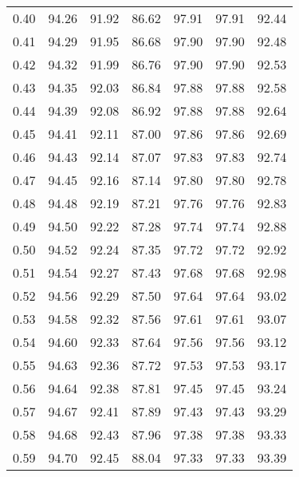 \begin{tabular}{|c|c|c|c|c|c|c|}
      0.40 &     94.26 &     91.92 &      86.62 &   97.91 &      97.91 &         92.44 \\
      0.41 &     94.29 &     91.95 &      86.68 &   97.90 &      97.90 &         92.48 \\
      0.42 &     94.32 &     91.99 &      86.76 &   97.90 &      97.90 &         92.53 \\
      0.43 &     94.35 &     92.03 &      86.84 &   97.88 &      97.88 &         92.58 \\
      0.44 &     94.39 &     92.08 &      86.92 &   97.88 &      97.88 &         92.64 \\
      0.45 &     94.41 &     92.11 &      87.00 &   97.86 &      97.86 &         92.69 \\
      0.46 &     94.43 &     92.14 &      87.07 &   97.83 &      97.83 &         92.74 \\
      0.47 &     94.45 &     92.16 &      87.14 &   97.80 &      97.80 &         92.78 \\
      0.48 &     94.48 &     92.19 &      87.21 &   97.76 &      97.76 &         92.83 \\
      0.49 &     94.50 &     92.22 &      87.28 &   97.74 &      97.74 &         92.88 \\
      0.50 &     94.52 &     92.24 &      87.35 &   97.72 &      97.72 &         92.92 \\
      0.51 &     94.54 &     92.27 &      87.43 &   97.68 &      97.68 &         92.98 \\
      0.52 &     94.56 &     92.29 &      87.50 &   97.64 &      97.64 &         93.02 \\
      0.53 &     94.58 &     92.32 &      87.56 &   97.61 &      97.61 &         93.07 \\
      0.54 &     94.60 &     92.33 &      87.64 &   97.56 &      97.56 &         93.12 \\
      0.55 &     94.63 &     92.36 &      87.72 &   97.53 &      97.53 &         93.17 \\
      0.56 &     94.64 &     92.38 &      87.81 &   97.45 &      97.45 &         93.24 \\
      0.57 &     94.67 &     92.41 &      87.89 &   97.43 &      97.43 &         93.29 \\
      0.58 &     94.68 &     92.43 &      87.96 &   97.38 &      97.38 &         93.33 \\
      0.59 &     94.70 &     92.45 &      88.04 &   97.33 &      97.33 &         93.39 \\

\end{tabular}
